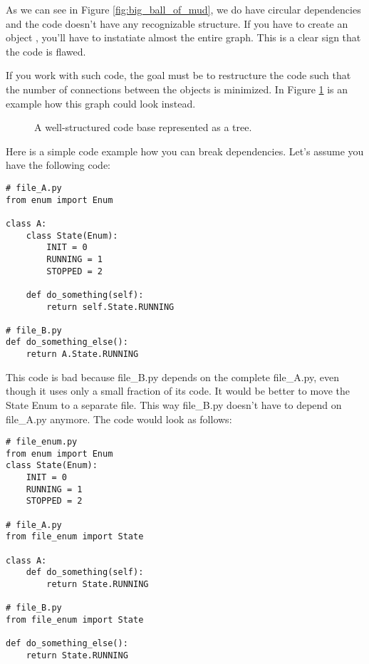 As we can see in Figure \ref{fig:big_ball_of_mud}, we do have circular dependencies and the code doesn't have any recognizable structure. If you have to create an object , you'll have to instatiate almost the entire graph. This is a clear sign that the code is flawed.

If you work with such code, the goal must be to restructure the code such that the number of connections between the objects is minimized. In Figure \ref{fig:well_structured_code} is an example how this graph could look instead.

\begin{figure}[h]
    \centering
    \caption{A well-structured code base represented as a tree.}
    \label{fig:well_structured_code}
\end{figure}

Here is a simple code example how you can break dependencies. Let's assume you have the following code:

\begin{programcode}{}   
\begin{verbatim}
# file_A.py
from enum import Enum

class A:
    class State(Enum):
        INIT = 0
        RUNNING = 1
        STOPPED = 2

    def do_something(self):
        return self.State.RUNNING

# file_B.py
def do_something_else():
    return A.State.RUNNING
\end{verbatim}
\end{programcode}

This code is bad because file\_B.py depends on the complete file\_A.py, even though it uses only a small fraction of its code. It would be better to move the State Enum to a separate file. This way file\_B.py doesn't have to depend on file\_A.py anymore. The code would look as follows:

\begin{programcode}{}
\begin{verbatim}
# file_enum.py
from enum import Enum
class State(Enum):
    INIT = 0
    RUNNING = 1
    STOPPED = 2 

# file_A.py
from file_enum import State

class A:
    def do_something(self):
        return State.RUNNING

# file_B.py
from file_enum import State

def do_something_else():
    return State.RUNNING

\end{verbatim}
\end{programcode}

